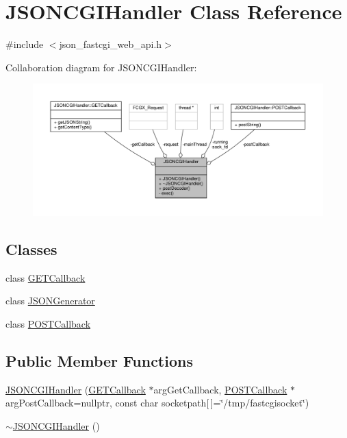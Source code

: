 \hypertarget{classJSONCGIHandler}{}\section{J\+S\+O\+N\+C\+G\+I\+Handler Class Reference}
\label{classJSONCGIHandler}


{\ttfamily \#include $<$json\+\_\+fastcgi\+\_\+web\+\_\+api.\+h$>$}



Collaboration diagram for J\+S\+O\+N\+C\+G\+I\+Handler\+:\nopagebreak
\begin{figure}[H]
\begin{center}
\leavevmode
\includegraphics[width=350pt]{classJSONCGIHandler__coll__graph}
\end{center}
\end{figure}
\subsection*{Classes}
\begin{DoxyCompactItemize}
\item 
class \hyperlink{classJSONCGIHandler_1_1GETCallback}{G\+E\+T\+Callback}
\item 
class \hyperlink{classJSONCGIHandler_1_1JSONGenerator}{J\+S\+O\+N\+Generator}
\item 
class \hyperlink{classJSONCGIHandler_1_1POSTCallback}{P\+O\+S\+T\+Callback}
\end{DoxyCompactItemize}
\subsection*{Public Member Functions}
\begin{DoxyCompactItemize}
\item 
\hyperlink{classJSONCGIHandler_a9bf5a96d13949d363225561ba6ac3b56}{J\+S\+O\+N\+C\+G\+I\+Handler} (\hyperlink{classJSONCGIHandler_1_1GETCallback}{G\+E\+T\+Callback} $\ast$arg\+Get\+Callback, \hyperlink{classJSONCGIHandler_1_1POSTCallback}{P\+O\+S\+T\+Callback} $\ast$arg\+Post\+Callback=nullptr, const char socketpath\mbox{[}$\,$\mbox{]}=\char`\"{}/tmp/fastcgisocket\char`\"{})
\item 
\hyperlink{classJSONCGIHandler_a4817e428a962bdea68123f2d32671f30}{$\sim$\+J\+S\+O\+N\+C\+G\+I\+Handler} ()
\end{DoxyCompactItemize}
